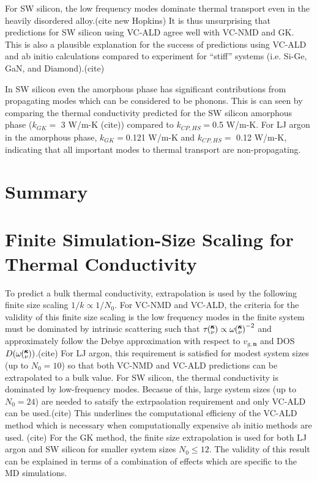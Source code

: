 \documentclass[aps,prb,twocolumn,superscriptaddress,preprintnumbers,amsmath,amssymb,floatfix]{revtex4}
\newcommand{\kv}{\mspace{-4.0mu}\left(\mspace{-8.0mu}
\begin{smallmatrix}&\pmb{\kappa} \\&\nu\end{smallmatrix}
\mspace{-3.0mu}\right)}
\begin{document}
For SW silicon, the low frequency modes dominate thermal transport 
even in the heavily disordered alloy.(cite new Hopkins) 
It is thus unsurprising that predictions for 
SW silicon using VC-ALD agree well with VC-NMD and GK. This is also a 
plausible explanation for the success of predictions using 
VC-ALD and ab initio calculations compared to experiment for 
``stiff'' systems (i.e. Si-Ge, GaN, and Diamond).(cite)

In SW silicon even the amorphous phase has significant contributions 
from propagating modes which can be considered to be phonons. This is 
can seen by comparing the thermal conductivity predicted for the 
SW silicon amorphous phase ($k_{GK} =$ 3 W/m-K (cite)) compared to 
$k_{CP,HS} = $0.5 W/m-K.  For LJ argon in the amorphous phase, 
$k_{GK} = $0.121 W/m-K and $k_{CP,HS} =$ 0.12 W/m-K, indicating that 
all important modes to thermal transport are non-propagating.

\section{\label{S:}Summary}


\appendix

\section{\label{A-Finite-Sim}Finite Simulation-Size Scaling for Thermal 
Conductivity}
To predict a bulk thermal conductivity, extrapolation is used by the 
following finite size scaling $ 1 / k \propto 1/N_0$. For VC-NMD and 
VC-ALD, the criteria for the validity of this finite size scaling 
is the low frequency modes in the finite system must be dominated by 
intrinsic scattering such that $\tau\kv \propto \omega\kv^{-2}$ 
and approximately follow the Debye approximation 
with respect to $v_{g,\mathbf{n}}$ and DOS $D(\omega\kv)$.(cite) For LJ 
argon, this requirement is satisfied for modest system sizes 
(up to $N_0 = 10$) so that both VC-NMD and VC-ALD predictions can be 
extrapolated to a bulk value. 
For SW silicon, the thermal conductivity is dominated by low-frequency 
modes. Becasue of this, large system sizes (up to $N_0 = 24$) are needed 
to satsify the 
extrpaolation requirement and only VC-ALD can be used.(cite) This 
underlines the computational efficieny of the VC-ALD method which is 
necessary when computationally expensive ab initio methods are used.
(cite) For the GK method, the finite size extrapolation is used for 
both LJ argon and SW silicon for smaller system sizes $N_0 \le 12$. 
The validity of this result can be explained in terms of a 
combination of effects which are specific to the MD simulations.
\cite{esfarjani_heat_2011}

\clearpage


\end{document}
